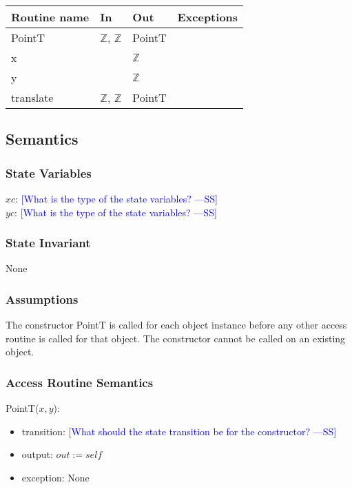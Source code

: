 \documentclass[12pt]{article}
\newcommand{\authornote}[3]{\textcolor{#1}{[#3 ---#2]}}
\newcommand{\authornote}[3]{}
\newcommand{\wss}[1]{\authornote{blue}{SS}{#1}}
\begin{document}
\begin{tabular}{| l | l | l | l |}
\hline
\textbf{Routine name} & \textbf{In} & \textbf{Out} & \textbf{Exceptions}\\
\hline
PointT & $\mathbb{Z}$, $\mathbb{Z}$ & PointT & \\
\hline
x & ~ & $\mathbb{Z}$ & ~\\
\hline
y & ~ & $\mathbb{Z}$ & ~\\
\hline
translate & $\mathbb{Z}$, $\mathbb{Z}$ & PointT & ~\\
\hline
\end{tabular}

\subsection* {Semantics}

\subsubsection* {State Variables}

$xc$: \wss{What is the type of the state variables?}\\
$yc$: \wss{What is the type of the state variables?}

\subsubsection* {State Invariant}

None

\subsubsection* {Assumptions}

The constructor PointT is called for each object instance before any other
access routine is called for that object.  The constructor cannot be called on
an existing object.

\subsubsection* {Access Routine Semantics}

PointT($x, y$):
\begin{itemize}
\item transition: \wss{What should the state transition be for the constructor?}
\item output: $out := \mathit{self}$
\item exception: None
\end{itemize}
\end{document}
